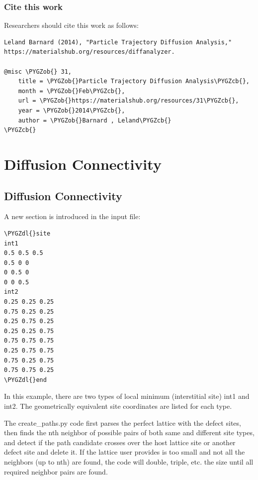 \documentclass[letterpaper,10pt,english]{sphinxmanual}
\def\PYGZob{\char`\{}
\def\PYGZcb{\char`\}}
\def\PYGZdl{\char`\$}
\begin{document}
\subsubsection{Cite this work}
\label{8_0_3_diffanalyzer:cite-this-work}
Researchers should cite this work as follows:

\begin{Verbatim}[commandchars=\\\{\}]
Leland Barnard (2014), "Particle Trajectory Diffusion Analysis," https://materialshub.org/resources/diffanalyzer.

@misc \PYGZob{} 31,
    title = \PYGZob{}Particle Trajectory Diffusion Analysis\PYGZcb{},
    month = \PYGZob{}Feb\PYGZcb{},
    url = \PYGZob{}https://materialshub.org/resources/31\PYGZcb{},
    year = \PYGZob{}2014\PYGZcb{},
    author = \PYGZob{}Barnard , Leland\PYGZcb{}
\PYGZcb{}
\end{Verbatim}


\section{Diffusion Connectivity}
\label{8_0_standalonetools:diffusion-connectivity}

\subsection{Diffusion Connectivity}
\label{8_0_1_diffusionconnectivity::doc}\label{8_0_1_diffusionconnectivity:diffusionconnectivity}\label{8_0_1_diffusionconnectivity:diffusion-connectivity}
A new section is introduced in the input file:

\begin{Verbatim}[commandchars=\\\{\}]
\PYGZdl{}site
int1
0.5 0.5 0.5
0.5 0 0
0 0.5 0
0 0 0.5
int2
0.25 0.25 0.25
0.75 0.25 0.25
0.25 0.75 0.25
0.25 0.25 0.75
0.75 0.75 0.75
0.25 0.75 0.75
0.75 0.25 0.75
0.75 0.75 0.25
\PYGZdl{}end
\end{Verbatim}

In this example, there are two types of local minimum (interstitial site) int1 and int2. The geometrically equivalent site coordinates are listed for each type.

The create\_paths.py code first parses the perfect lattice with the defect sites, then finds the nth neighbor of possible pairs of both same and different site types, and detect if the path candidate crosses over the host lattice site or another defect site and delete it.
If the lattice user provides is too small and not all the neighbors (up to nth) are found, the code will double, triple, etc. the size until all required neighbor pairs are found.
\end{document}
